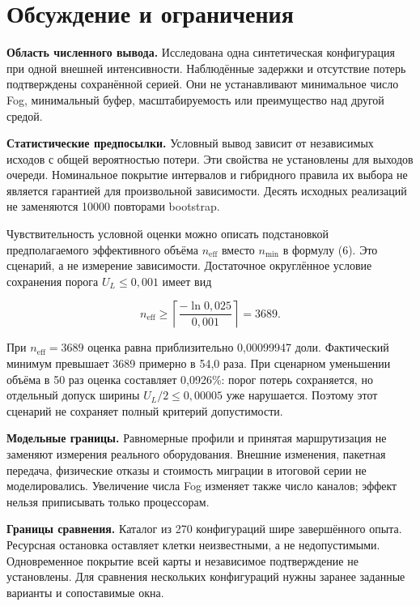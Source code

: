 \hypertarget{ux43eux431ux441ux443ux436ux434ux435ux43dux438ux435-ux438-ux43eux433ux440ux430ux43dux438ux447ux435ux43dux438ux44f}{%
\FloatBarrier
\section{Обсуждение и ограничения}}

\textbf{Область численного вывода.} Исследована одна синтетическая конфигурация при одной внешней интенсивности. Наблюдённые задержки и отсутствие потерь подтверждены сохранённой серией. Они не устанавливают минимальное число Fog, минимальный буфер, масштабируемость или преимущество над другой средой.

\textbf{Статистические предпосылки.} Условный вывод зависит от независимых исходов с общей вероятностью потери. Эти свойства не установлены для выходов очереди. Номинальное покрытие интервалов и гибридного правила их выбора не является гарантией для произвольной зависимости. Десять исходных реализаций не заменяются 10000 повторами bootstrap.

Чувствительность условной оценки можно описать подстановкой предполагаемого эффективного объёма \(n_{\mathrm{eff}}\) вместо \(n_{\min}\) в формулу (6). Это сценарий, а не измерение зависимости. Достаточное округлённое условие сохранения порога \(U_L\leq0{,}001\) имеет вид

\begin{equation}\label{eq:9}
n_{\mathrm{eff}}\geq
\left\lceil\frac{-\ln0{,}025}{0{,}001}\right\rceil=3689.
\end{equation}

При \(n_{\mathrm{eff}}=3689\) оценка равна приблизительно 0,00099947 доли. Фактический минимум превышает 3689 примерно в 54,0 раза. При сценарном уменьшении объёма в 50 раз оценка составляет 0,0926\%: порог потерь сохраняется, но отдельный допуск ширины \(U_L/2\leq0{,}00005\) уже нарушается. Поэтому этот сценарий не сохраняет полный критерий допустимости.

\textbf{Модельные границы.} Равномерные профили и принятая маршрутизация не заменяют измерения реального оборудования. Внешние изменения, пакетная передача, физические отказы и стоимость миграции в итоговой серии не моделировались. Увеличение числа Fog изменяет также число каналов; эффект нельзя приписывать только процессорам.

\textbf{Границы сравнения.} Каталог из 270 конфигураций шире завершённого опыта. Ресурсная остановка оставляет клетки неизвестными, а не недопустимыми. Одновременное покрытие всей карты и независимое подтверждение не установлены. Для сравнения нескольких конфигураций нужны заранее заданные варианты и сопоставимые окна.


